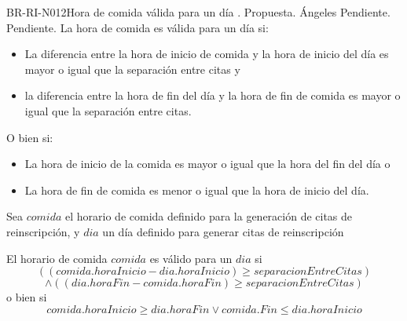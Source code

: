 \begin{BusinessRule}{BR-RI-N012}{Hora de comida válida para un día}
	{\bcCondition }    %
	{\btEnabler }    %
	{\blControlling}    %
	.
	\BRItem[Estado] Propuesta.
	 Ángeles
	 Pendiente.
	 Pendiente.
	\BRItem[Descripción]La hora de comida es válida para un día si:
	\begin{itemize}
		\item La diferencia entre la hora de inicio de comida y la hora de inicio del día es mayor o igual que la separación entre citas y 
		\item la diferencia entre la hora de fin del día y la hora de fin de comida es mayor o igual que la separación entre citas.
	\end{itemize}

	O bien si:
	\begin{itemize}
		\item La hora de inicio de la comida es mayor o igual que la hora del fin del día o
		\item La hora de fin de comida es menor o igual que la hora de inicio del día.
	\end{itemize}
	\BRItem[Sentencia] \cdtEmpty
	Sea $comida$ el horario de comida definido para la generación de citas de reinscripción, y $dia$ un día definido para generar citas de reinscripción

	El horario de comida $comida$ es válido para un $dia$ si
	 $$ ( (comida.horaInicio - dia.horaInicio) \geq separacionEntreCitas ) $$ $$\land  ( (dia.horaFin - comida.horaFin) \geq separacionEntreCitas) $$ 
	 o bien si
	 $$ comida.horaInicio \geq dia.horaFin \lor comida.Fin \leq dia.horaInicio$$
	 

\end{BusinessRule}
